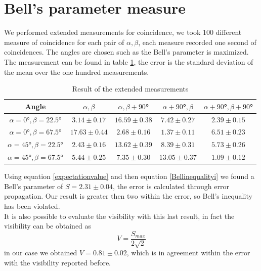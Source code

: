\documentclass[a4paper,10pt]{article}
\begin{document}
\section{Bell's parameter measure}
We performed extended measurements for coincidence, we took 100 different measure of coincidence for each pair of $\alpha,\beta$, each measure recorded one second of coincidences. The angles are chosen such as the Bell's parameter is maximized. The measurement can be found in table \ref{tab:extendedmeasures}, the error is the standard deviation of the mean over the one hundred measurements.
\begin{table}[H]
\centering
\begin{tabular}{c|c|c|c|c}
Angle  & $\alpha,\beta$& $\alpha,\beta+90$°&$\alpha+90$°$,\beta$& $\alpha+90$°$,\beta+90$° \\
\hline
$\alpha=0$°$,\beta=22.5$° & $3.14\pm0.17$ & $16.59\pm0.38$ & $7.42\pm0.27$ &$2.39\pm0.15$\\
$\alpha=0$°$,\beta=67.5$° & $17.63\pm0.44$ & $2.68\pm0.16$ & $1.37\pm0.11$ &$6.51\pm0.23$\\
$\alpha=45$°$,\beta=22.5$° & $2.43\pm0.16$ & $13.62\pm0.39$ & $8.39\pm0.31$ & $5.73\pm0.26$\\
$\alpha=45$°$,\beta=67.5$° & $5.44\pm0.25$ & $7.35\pm 0.30$ & $13.05\pm0.37$ & $1.09\pm0.12$\\
\end{tabular}
\caption{\label{tab:extendedmeasures}Result of the extended measurements}
\end{table}
Using equation \eqref{expectationvalue} and then equation \eqref{Bellinequalityi} we found a Bell's parameter of $S = 2.31\pm 0.04$, the error is calculated through error propagation. Our result is greater then two within the error, so Bell's inequality has been violated. \\
It is also possible to evaluate the visibility with this last result, in fact the visibility can be obtained as
\[V = \frac{S_{max}}{2\sqrt{2}}\]
in our case we obtained $V = 0.81 \pm 0.02$, which is in agreement within the error with the visibility reported before.
\end{document}
